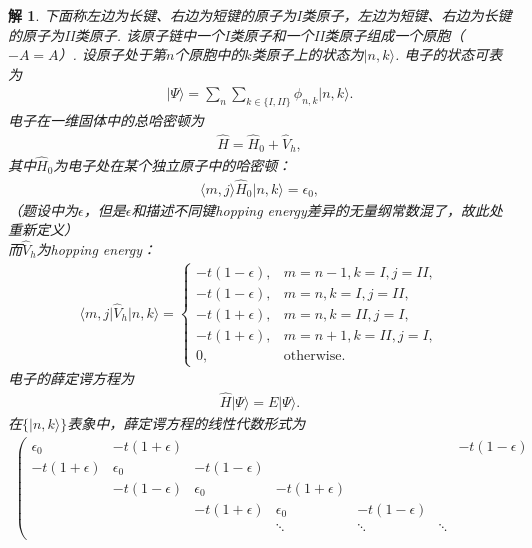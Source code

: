 \documentclass[UTF8,10pt,a4paper]{article}
\theoremstyle{Problem}
\theoremstyle{Solution}
\newtheorem*{sol}{解}
\begin{document}
\begin{sol}
    下面称左边为长键、右边为短键的原子为I类原子，左边为短键、右边为长键的原子为II类原子. 该原子链中一个I类原子和一个II类原子组成一个原胞（$-A=A$）. 设原子处于第$n$个原胞中的$k$类原子上的状态为$\lvert n,k\rangle$. 电子的状态可表为
    \begin{align}
        \lvert\Psi\rangle=\sum_n\sum_{k\in\{I,II\}}\phi_{n,k}\lvert n,k\rangle.
    \end{align}
    电子在一维固体中的总哈密顿为
    \begin{align}
        \hat{H}=\hat{H}_0+\hat{V}_h,
    \end{align}
    其中$\hat{H}_0$为电子处在某个独立原子中的哈密顿：
    \begin{align}
        \langle m,j\rangle\hat{H}_0\lvert n,k\rangle=\epsilon_0,
    \end{align}
    （题设中为$\epsilon$，但是$\epsilon$和描述不同键hopping energy差异的无量纲常数混了，故此处重新定义）\\
    而$\hat{V}_h$为hopping energy：
    \begin{align}
        \langle m,j\rvert\hat{V}_h\lvert n,k\rangle=\left\{\begin{array}{ll}
            -t(1-\epsilon),&m=n-1,k=I,j=II,\\
            -t(1-\epsilon),&m=n,k=I,j=II,\\
            -t(1+\epsilon),&m=n,k=II,j=I,\\
            -t(1+\epsilon),&m=n+1,k=II,j=I,\\
            0,&\text{otherwise}.
        \end{array}\right.
    \end{align}
    电子的薛定谔方程为
    \begin{align}
        \hat{H}\lvert\Psi\rangle=E\lvert\Psi\rangle.
    \end{align}
    在$\{\lvert n,k\rangle\}$表象中，薛定谔方程的线性代数形式为
    \begin{align}
        \left(\begin{matrix}
            \epsilon_0 & -t(1+\epsilon) &  &  &  &  & -t(1-\epsilon) \\
                -t(1+\epsilon) & \epsilon_0 & -t(1-\epsilon) &  &  &  &  \\
                 & -t(1-\epsilon) & \epsilon_0 & -t(1+\epsilon) &  &  &  \\
                 &  & -t(1+\epsilon) & \epsilon_0 & -t(1-\epsilon) &  &  \\
                 &  &  & \ddots & \ddots & \ddots &  \\

\end{matrix}
\end{align}
\end{sol}
\end{document}
